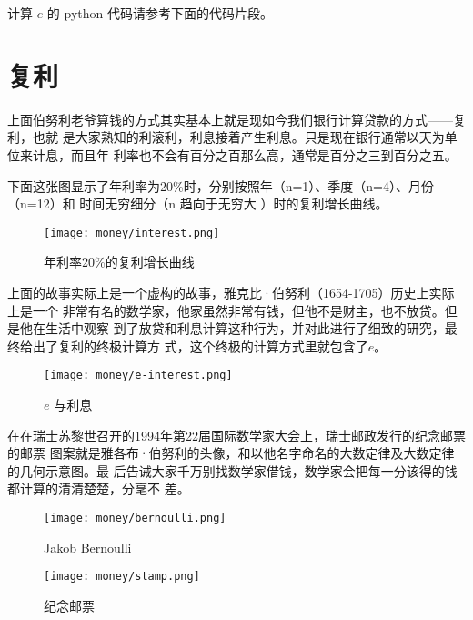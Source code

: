 计算 $e$ 的 python 代码请参考下面的代码片段。



\section{复利}
上面伯努利老爷算钱的方式其实基本上就是现如今我们银行计算贷款的方式——复利，也就
是大家熟知的利滚利，利息接着产生利息。只是现在银行通常以天为单位来计息，而且年
利率也不会有百分之百那么高，通常是百分之三到百分之五。

下面这张图显示了年利率为20\%时，分别按照年（n=1）、季度（n=4）、月份（n=12）和
时间无穷细分（n 趋向于无穷大 ）时的复利增长曲线。

\begin{figure}[htbp]
\centering
\texttt{[image: money/interest.png]}
\caption{年利率20\%的复利增长曲线}
\centering
\end{figure}

上面的故事实际上是一个虚构的故事，雅克比·伯努利（1654-1705）历史上实际上是一个
非常有名的数学家，他家虽然非常有钱，但他不是财主，也不放贷。但是他在生活中观察
到了放贷和利息计算这种行为，并对此进行了细致的研究，最终给出了复利的终极计算方
式，这个终极的计算方式里就包含了$e$。

\begin{figure}[htbp]
\centering
\texttt{[image: money/e-interest.png]}
\caption{$ e$ 与利息}
\centering
\end{figure}

在在瑞士苏黎世召开的1994年第22届国际数学家大会上，瑞士邮政发行的纪念邮票的邮票
图案就是雅各布·伯努利的头像，和以他名字命名的大数定律及大数定律的几何示意图。最
后告诫大家千万别找数学家借钱，数学家会把每一分该得的钱都计算的清清楚楚，分毫不
差。

\begin{figure}[htbp]
\centering
\begin{minipage}[t]{.45\linewidth}
\texttt{[image: money/bernoulli.png]}
\caption{Jakob Bernoulli}
\end{minipage}
\begin{minipage}[t]{.45\linewidth}
\texttt{[image: money/stamp.png]}
\caption{纪念邮票}
\end{minipage}
\end{figure}
